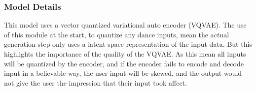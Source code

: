\documentclass[final,5p,times,authoryear]{article}
\begin{document}
\subsubsection{Model Details}
This model uses a vector quantized variational auto encoder (VQVAE). The use of
this module at the start, to quantize any dance inputs, mean the actual
generation step only uses a latent space representation of the input data. But
this highlights the importance of the quality of the VQVAE. As this mean all
inputs will be quantized by the encoder, and if the encoder fails to encode and
decode input in a believable way, the user input will be skewed, and the output
would not give the user the impression that their input took affect. 

\subsubsection{}
\end{document}
